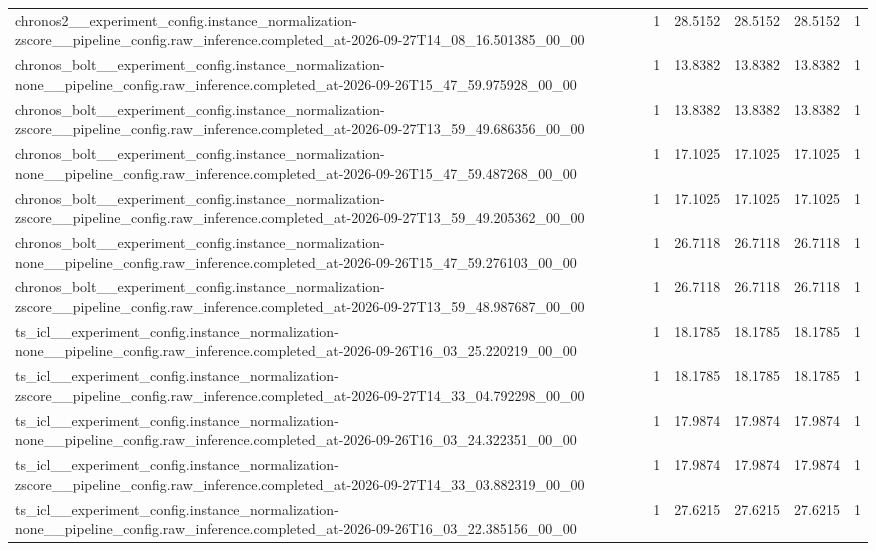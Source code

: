 \begin{tabular}{llllll}
chronos2\_\_experiment\_config.instance\_normalization-zscore\_\_pipeline\_config.raw\_inference.completed\_at-2026-09-27T14\_08\_16.501385\_00\_00 & 1 & 28.5152 & 28.5152 & 28.5152 & 1 \\
chronos\_bolt\_\_experiment\_config.instance\_normalization-none\_\_pipeline\_config.raw\_inference.completed\_at-2026-09-26T15\_47\_59.975928\_00\_00 & 1 & 13.8382 & 13.8382 & 13.8382 & 1 \\
chronos\_bolt\_\_experiment\_config.instance\_normalization-zscore\_\_pipeline\_config.raw\_inference.completed\_at-2026-09-27T13\_59\_49.686356\_00\_00 & 1 & 13.8382 & 13.8382 & 13.8382 & 1 \\
chronos\_bolt\_\_experiment\_config.instance\_normalization-none\_\_pipeline\_config.raw\_inference.completed\_at-2026-09-26T15\_47\_59.487268\_00\_00 & 1 & 17.1025 & 17.1025 & 17.1025 & 1 \\
chronos\_bolt\_\_experiment\_config.instance\_normalization-zscore\_\_pipeline\_config.raw\_inference.completed\_at-2026-09-27T13\_59\_49.205362\_00\_00 & 1 & 17.1025 & 17.1025 & 17.1025 & 1 \\
chronos\_bolt\_\_experiment\_config.instance\_normalization-none\_\_pipeline\_config.raw\_inference.completed\_at-2026-09-26T15\_47\_59.276103\_00\_00 & 1 & 26.7118 & 26.7118 & 26.7118 & 1 \\
chronos\_bolt\_\_experiment\_config.instance\_normalization-zscore\_\_pipeline\_config.raw\_inference.completed\_at-2026-09-27T13\_59\_48.987687\_00\_00 & 1 & 26.7118 & 26.7118 & 26.7118 & 1 \\
ts\_icl\_\_experiment\_config.instance\_normalization-none\_\_pipeline\_config.raw\_inference.completed\_at-2026-09-26T16\_03\_25.220219\_00\_00 & 1 & 18.1785 & 18.1785 & 18.1785 & 1 \\
ts\_icl\_\_experiment\_config.instance\_normalization-zscore\_\_pipeline\_config.raw\_inference.completed\_at-2026-09-27T14\_33\_04.792298\_00\_00 & 1 & 18.1785 & 18.1785 & 18.1785 & 1 \\
ts\_icl\_\_experiment\_config.instance\_normalization-none\_\_pipeline\_config.raw\_inference.completed\_at-2026-09-26T16\_03\_24.322351\_00\_00 & 1 & 17.9874 & 17.9874 & 17.9874 & 1 \\
ts\_icl\_\_experiment\_config.instance\_normalization-zscore\_\_pipeline\_config.raw\_inference.completed\_at-2026-09-27T14\_33\_03.882319\_00\_00 & 1 & 17.9874 & 17.9874 & 17.9874 & 1 \\
ts\_icl\_\_experiment\_config.instance\_normalization-none\_\_pipeline\_config.raw\_inference.completed\_at-2026-09-26T16\_03\_22.385156\_00\_00 & 1 & 27.6215 & 27.6215 & 27.6215 & 1 \\

\end{tabular}
